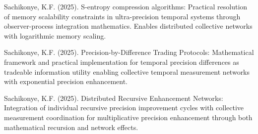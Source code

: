 \documentclass[12pt,a4paper]{article}
\begin{document}
\begin{thebibliography}{99}
Sachikonye, K.F. (2025). S-entropy compression algorithms: Practical resolution of memory scalability constraints in ultra-precision temporal systems through observer-process integration mathematics. Enables distributed collective networks with logarithmic memory scaling.

Sachikonye, K.F. (2025). Precision-by-Difference Trading Protocols: Mathematical framework and practical implementation for temporal precision differences as tradeable information utility enabling collective temporal measurement networks with exponential precision enhancement.

Sachikonye, K.F. (2025). Distributed Recursive Enhancement Networks: Integration of individual recursive precision improvement cycles with collective measurement coordination for multiplicative precision enhancement through both mathematical recursion and network effects.

\end{thebibliography}
\end{document}
